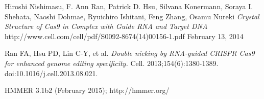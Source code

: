 \documentclass[11pt, oneside]{article}
\begin{document}
\begin{thebibliography}{1}
Hiroshi Nishimasu, F. Ann Ran, Patrick D. Hsu, Silvana Konermann, Soraya I. Shehata, Naoshi Dohmae, Ryuichiro Ishitani, Feng Zhang, Osamu Nureki \emph{Crystal Structure of Cas9 in Complex with Guide RNA and Target DNA} http://www.cell.com/cell/pdf/S0092-8674(14)00156-1.pdf February 13, 2014

Ran FA, Hsu PD, Lin C-Y, et al. \emph{Double nicking by RNA-guided CRISPR Cas9 for enhanced genome editing specificity.} Cell. 2013;154(6):1380-1389. doi:10.1016/j.cell.2013.08.021.

HMMER 3.1b2 (February 2015); http://hmmer.org/

\end{thebibliography}
\end{document}
